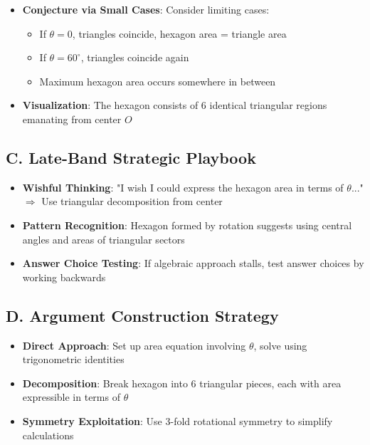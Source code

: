 \documentclass[12pt]{article}
\begin{document}
\begin{strategicbox}
\begin{itemize}[leftmargin=*]
    \item \textbf{Conjecture via Small Cases}: Consider limiting cases:
    \begin{itemize}
        \item If $\theta = 0$, triangles coincide, hexagon area = triangle area
        \item If $\theta = 60^{\circ}$, triangles coincide again
        \item Maximum hexagon area occurs somewhere in between
    \end{itemize}
    
    \item \textbf{Visualization}: The hexagon consists of 6 identical triangular regions emanating from center $O$
\end{itemize}

\subsection*{C. Late-Band Strategic Playbook}
\begin{itemize}[leftmargin=*]
    \item \textbf{Wishful Thinking}: "I wish I could express the hexagon area in terms of $\theta$..." $\Rightarrow$ Use triangular decomposition from center
    
    \item \textbf{Pattern Recognition}: Hexagon formed by rotation suggests using central angles and areas of triangular sectors
    
    \item \textbf{Answer Choice Testing}: If algebraic approach stalls, test answer choices by working backwards
\end{itemize}

\subsection*{D. Argument Construction Strategy}
\begin{itemize}[leftmargin=*]
    \item \textbf{Direct Approach}: Set up area equation involving $\theta$, solve using trigonometric identities
    
    \item \textbf{Decomposition}: Break hexagon into 6 triangular pieces, each with area expressible in terms of $\theta$
    
    \item \textbf{Symmetry Exploitation}: Use 3-fold rotational symmetry to simplify calculations
\end{itemize}


\end{strategicbox}
\end{document}
